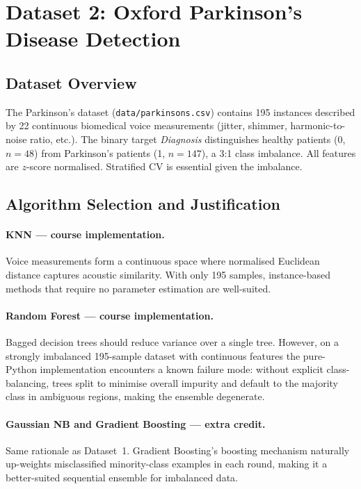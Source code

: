 \documentclass[11pt,letterpaper]{article}
\begin{document}
\section{Dataset 2: Oxford Parkinson's Disease Detection}

\subsection{Dataset Overview}

The Parkinson's dataset (\texttt{data/parkinsons.csv}) contains 195 instances
described by 22 continuous biomedical voice measurements (jitter, shimmer,
harmonic-to-noise ratio, etc.).  The binary target \textit{Diagnosis}
distinguishes healthy patients (0, $n=48$) from Parkinson's patients
(1, $n=147$), a 3:1 class imbalance.  All features are $z$-score normalised.
Stratified CV is essential given the imbalance.

\subsection{Algorithm Selection and Justification}

\paragraph{KNN --- course implementation.}
Voice measurements form a continuous space where normalised Euclidean distance
captures acoustic similarity.  With only 195 samples, instance-based methods
that require no parameter estimation are well-suited.

\paragraph{Random Forest --- course implementation.}
Bagged decision trees should reduce variance over a single tree.  However,
on a strongly imbalanced 195-sample dataset with continuous features the
pure-Python implementation encounters a known failure mode: without explicit
class-balancing, trees split to minimise overall impurity and default to the
majority class in ambiguous regions, making the ensemble degenerate.

\paragraph{Gaussian NB and Gradient Boosting --- extra credit.}
Same rationale as Dataset~1.  Gradient Boosting's boosting mechanism naturally
up-weights misclassified minority-class examples in each round, making it a
better-suited sequential ensemble for imbalanced data.
\end{document}

